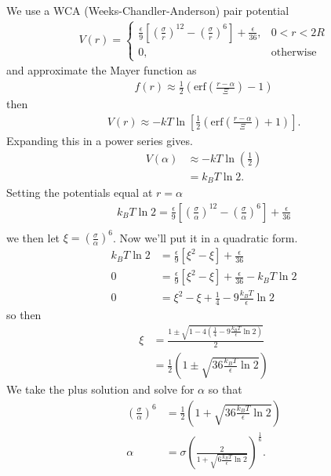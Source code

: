 \documentclass[letterpaper,twocolumn,amsmath,amssymb,prb]{revtex4-1}
\begin{document}
We use a WCA (Weeks-Chandler-Anderson) pair potential
\begin{align}
  V(r) =
  \begin{cases}
    \frac{\epsilon}{9} \left[ \left(\frac{\sigma}{r}\right)^{12} -
    \left(\frac{\sigma}{r}\right)^{6} \right] +
    \frac{\epsilon}{36}, & 0 < r < 2R \\
    0, & \textrm{otherwise}
  \end{cases}
\end{align}
and approximate the Mayer function as
\begin{align}
  f(r) \approx \tfrac12 \left( \mathrm{erf}\left( \frac{r - \alpha}{\Xi} \right) - 1 \right)
\end{align}
then
\begin{align}
  V(r) \approx -kT\ln\left[\tfrac12 \left( \mathrm{erf}\left( \frac{r -
    \alpha}{\Xi} \right) + 1 \right) \right].
\end{align}
Expanding this in a power series gives.
\begin{align}
  V(\alpha) &\approx -kT\ln\left(\tfrac12\right) \\
  &= k_BT \ln 2.
\end{align}
Setting the potentials equal at $r=\alpha$
\begin{align}
  k_BT \ln 2 = \frac{\epsilon}{9} \left[ \left(\frac{\sigma}{\alpha}\right)^{12} -
    \left(\frac{\sigma}{\alpha}\right)^{6} \right] +
    \frac{\epsilon}{36} \\
\end{align}
we then let $\xi = \left(\frac{\sigma}{\alpha}\right)^6$. Now we'll put it in a
quadratic form.
\begin{align}
  k_BT \ln 2 &= \frac{\epsilon}{9} \left[ \xi^2 - \xi  \right] +
  \frac{\epsilon}{36} \\
  0 &= \frac{\epsilon}{9} \left[ \xi^2 - \xi  \right] + \frac{\epsilon}{36} -
  k_BT \ln 2 \\
  0 &= \xi^2 - \xi + \frac{1}{4} - 9\frac{k_BT}{\epsilon} \ln 2
\end{align}
so then
\begin{align}
  \xi &= \frac{1\pm \sqrt{1-4 \left( \frac{1}{4} - 9 \frac{k_BT}{\epsilon}
    \ln 2 \right)}}{2} \\
  &= \frac{1}{2}\left(1 \pm \sqrt{36 \frac{k_BT}{\epsilon} \ln 2} \right)
\end{align}
We take the plus solution and solve for $\alpha$ so that
\begin{align}
  \left(\frac{\sigma}{\alpha}\right)^6 &= \frac{1}{2}\left(1 +
  \sqrt{36 \frac{k_BT}{\epsilon} \ln 2} \right) \\
  \alpha &= \sigma \left( \frac{2}{1 + \sqrt{6 \frac{k_BT}{\epsilon}
        \ln 2}} \right)^{\frac{1}{6}}.
\end{align}
\end{document}

